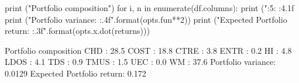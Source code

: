 \begin{solution}
\begin{ipython}
print ("Portfolio composition")
for i, n in enumerate(df.columns):
    print ("{:5}: {:4.1f}%
print ("Portfolio variance: {:.4f}".format(opts.fun**2))
print ("Expected Portfolio return: {:.3f}".format(opts.x.dot(returns)))

Portfolio composition
CHD  : 28.5%
COST : 18.8%
CTRE : 3.8%
ENTR : 0.2%
HI   : 4.8%
LDOS : 4.1%
TDS  : 0.9%
TMUS : 1.5%
UEC  : 0.0%
WM   : 37.6%
Portfolio variance: 0.0129
Expected Portfolio return: 0.172
\end{ipython}
\end{solution}

%		
